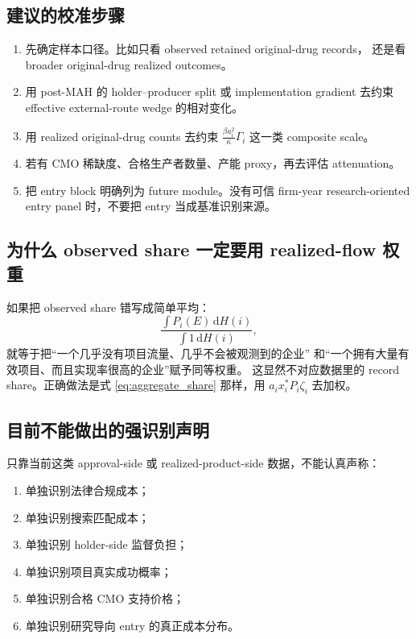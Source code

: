 \documentclass[12pt,UTF8]{ctexart}
\newcommand{\dd}{\,\mathrm{d}}
\theoremstyle{plain}
\theoremstyle{remark}
\begin{document}
\subsection{建议的校准步骤}

\begin{enumerate}[leftmargin=2em]
    \item 先确定样本口径。比如只看 observed retained original-drug records，
    还是看 broader original-drug realized outcomes。
    \item 用 post-MAH 的 holder--producer split 或 implementation gradient
    去约束 effective external-route wedge 的相对变化。
    \item 用 realized original-drug counts 去约束
    $\frac{\beta a_i^2}{\kappa}\Gamma_i$ 这一类 composite scale。
    \item 若有 CMO 稀缺度、合格生产者数量、产能 proxy，再去评估 attenuation。
    \item 把 entry block 明确列为 future module。没有可信 firm-year
    research-oriented entry panel 时，不要把 entry 当成基准识别来源。
\end{enumerate}

\subsection{为什么 observed share 一定要用 realized-flow 权重}

如果把 observed share 错写成简单平均：
\[
\frac{\int P_i(E)\dd H(i)}{\int 1\dd H(i)},
\]
就等于把“一个几乎没有项目流量、几乎不会被观测到的企业”
和“一个拥有大量有效项目、而且实现率很高的企业”赋予同等权重。
这显然不对应数据里的 record share。正确做法是式
\eqref{eq:aggregate_share} 那样，用
$a_i x_i^*P_i\zeta_i$ 去加权。

\subsection{目前不能做出的强识别声明}

只靠当前这类 approval-side 或 realized-product-side 数据，不能认真声称：

\begin{enumerate}[leftmargin=2em]
    \item 单独识别法律合规成本；
    \item 单独识别搜索匹配成本；
    \item 单独识别 holder-side 监督负担；
    \item 单独识别项目真实成功概率；
    \item 单独识别合格 CMO 支持价格；
    \item 单独识别研究导向 entry 的真正成本分布。
\end{enumerate}
\end{document}
